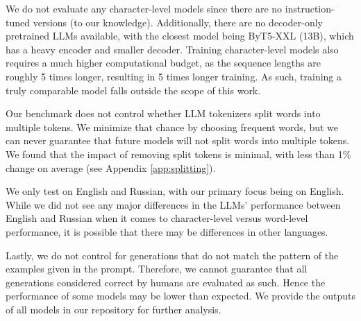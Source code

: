 We do not evaluate any character-level models since there are no instruction-tuned versions (to our knowledge). Additionally, there are no decoder-only pretrained LLMs available, with the closest model being ByT5-XXL (13B), which has a heavy encoder and smaller decoder. Training character-level models also requires a much higher computational budget, as the sequence lengths are roughly 5 times longer, resulting in 5 times longer training. As such, training a truly comparable model falls outside the scope of this work.

Our benchmark does not control whether LLM tokenizers split words into multiple tokens. We minimize that chance by choosing frequent words, but we can never guarantee that future models will not split words into multiple tokens. We found that the impact of removing split tokens is minimal, with less than 1\% change on average (see Appendix \ref{app:splitting}). 

We only test on English and Russian, with our primary focus being on English. While we did not see any major differences in the LLMs' performance between English and Russian when it comes to character-level versus word-level performance, it is possible that there may be differences in other languages. 

Lastly, we do not control for generations that do not match the pattern of the examples given in the prompt. Therefore, we cannot guarantee that all generations considered correct by humans are evaluated as such. Hence the performance of some models may be lower than expected. We provide the outputs of all models in our repository for further analysis. 


